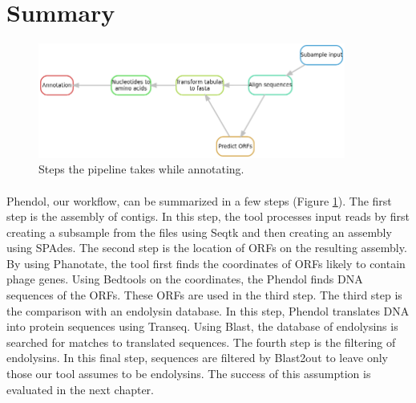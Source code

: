 \section{Summary}

\begin{figure}[h]
  \begin{center}
     \includegraphics[width=0.9\textwidth]{images/pipeline.png}
     \caption{Steps the pipeline takes while annotating.}\label{fig:pipeline}
  \end{center}
\end{figure} 

\paragraph*{}
Phendol, our workflow, can be summarized in a few steps (Figure \ref{fig:pipeline}). The first step is the assembly of contigs. In this step, the tool processes input reads by first creating a subsample from the files using Seqtk and then creating an assembly using SPAdes. The second step is the location of ORFs on the resulting assembly. By using Phanotate, the tool first finds the coordinates of ORFs likely to contain phage genes. Using Bedtools on the coordinates, the Phendol finds DNA sequences of the ORFs. These ORFs are used in the third step. The third step is the comparison with an endolysin database. In this step, Phendol translates DNA into protein sequences using Transeq. Using Blast, the database of endolysins is searched for matches to translated sequences. The fourth step is the filtering of endolysins. In this final step, sequences are filtered by Blast2out to leave only those our tool assumes to be endolysins. The success of this assumption is evaluated in the next chapter.
